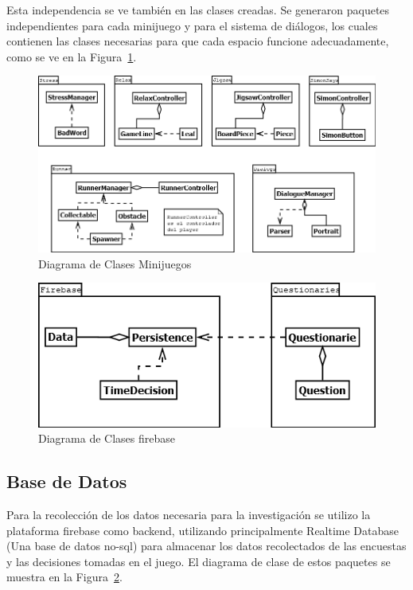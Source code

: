 Esta independencia se ve también en las clases creadas. Se generaron paquetes independientes para cada minijuego y para el sistema de diálogos, los cuales contienen las clases necesarias para que cada espacio funcione adecuadamente, como se ve en la Figura~\ref{fig:diagrama-clases}.

\begin{figure}[h]
    \centering
    \includegraphics[width=\textwidth]{imgs/diagrama_clases.png}
    \caption{Diagrama de Clases Minijuegos}
    \label{fig:diagrama-clases}
\end{figure}

\begin{figure}[h]
    \centering
    \includegraphics[scale=0.7]{imgs/diagrama_encuesta.png}
    \caption{Diagrama de Clases \Gls{firebase}}
    \label{fig:clases-firebase}
\end{figure}

\subsection{Base de Datos}
Para la recolección de los datos necesaria para la investigación se utilizo la plataforma \Gls{firebase} como \gls{backend}, utilizando principalmente Realtime Database (Una base de datos no-sql) para almacenar los datos recolectados de las encuestas y las decisiones tomadas en el juego. El diagrama de clase de estos paquetes se muestra en la Figura~\ref{fig:clases-firebase}.

